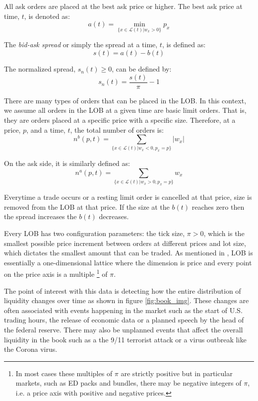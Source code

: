 All ask orders are placed at the best ask price or higher. The best ask price at time, $t$, is denoted as:
\begin{equation}
a(t) = \min_{\{x \in \mathcal{L}(t)|w_x>0 \}} p_x
\end{equation}

The \textit{bid-ask spread} or simply the spread at a time, $t$, is defined as:
\begin{equation}
s(t) = a(t) - b(t)
\end{equation}

The normalized spread, $s_n(t) \geq 0$, can be defined by: 
\begin{equation}
s_n(t) = \frac{s(t)}{\pi} - 1
\end{equation}

There are many types of orders that can be placed in the LOB. In this context, we assume all orders in the LOB at a given time are basic limit orders. That is, they are orders placed at a specific price with a specific size. Therefore, at a price, $p$, and a time, $t$, the total number of orders is:
\begin{equation}
n^b(p, t) = \sum_{\{x \in \mathcal{L}(t)|w_x<0 , p_x=p\}} |w_x|
\end{equation}

On the ask side, it is similarly defined as:
\begin{equation}
n^a(p, t) = \sum_{\{x \in \mathcal{L}(t)|w_x>0 , p_x=p\}}  w_x
\end{equation}

Everytime a trade occurs or a resting limit order is cancelled at that price, size is removed from the LOB at that price. If the size at the $b(t)$ reaches zero then the spread increases the $b(t)$ decreases. 


Every LOB has two configuration parameters: the tick size, $\pi >0$, which is the smallest possible price increment between orders at different prices and lot size, which dictates the smallest amount that can be traded. As mentioned in \cite{gould2016queue}, LOB is essentially a one-dimensional lattice where the dimension is price and every point on the price axis is a multiple \footnote{In most cases these multiples of $\pi$ are strictly positive but in particular markets, such as ED packs and bundles, there may be negative integers of $\pi$, i.e. a price axis with positive and negative prices.} of $\pi$.

The point of interest with this data is detecting how the entire distribution of liquidity changes over time as shown in figure \ref{fig:book_img}. These changes are often associated with events happening in the market such as the start of U.S. trading hours, the release of economic data or a planned speech by the head of the federal reserve. There may also be unplanned events that affect the overall liquidity in the book such as a the 9/11 terrorist attack or a virus outbreak like the Corona virus.

